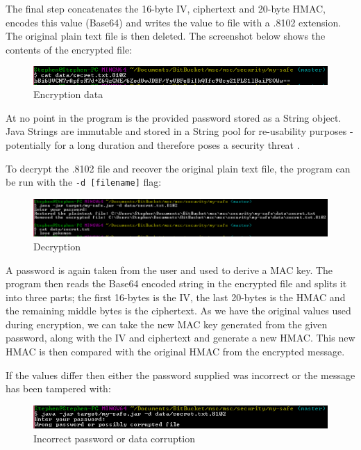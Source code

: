\documentclass[journal,comsoc]{IEEEtran}
\begin{document}
	The final step concatenates the 16-byte IV, ciphertext and 20-byte HMAC, encodes this value (Base64) and writes the value to file with a .8102 extension. The original plain text file is then deleted. The screenshot below shows the contents of the encrypted file:
	
	\begin{figure}[h!]
		\centering
		\includegraphics[width=0.9\linewidth]{images/safe_encrypted_data.png}
		\caption{Encryption data}
		\label{fig:encryptiondata}
	\end{figure}
	
	At no point in the program is the provided password stored as a String object. Java Strings are immutable and stored in a String pool for re-usability purposes - potentially for a long duration and therefore poses a security threat \cite{IEEEhowto:javastrings}.
	
	To decrypt the .8102 file and recover the original plain text file, the program can be run with the \texttt{-d [filename]} flag:
	
	\begin{figure}[h!]
		\centering
		\includegraphics[width=0.9\linewidth]{images/safe_decrypt.png}
		\caption{Decryption}
		\label{fig:decryption}
	\end{figure}
	
	A password is again taken from the user and used to derive a MAC key. The program then reads the Base64 encoded string in the encrypted file and splits it into three parts; the first 16-bytes is the IV, the last 20-bytes is the HMAC and the remaining middle bytes is the ciphertext. As we have the original values used during encryption, we can take the new MAC key generated from the given password, along with the IV and ciphertext and generate a new HMAC. This new HMAC is then compared with the original HMAC from the encrypted message. 
	
	If the values differ then either the password supplied was incorrect or the message has been tampered with: 
	
	\begin{figure}[h!]
		\centering
		\includegraphics[width=0.9\linewidth]{images/safe_corrupted.png}
		\caption{Incorrect password or data corruption}
		\label{fig:corrupted}
	\end{figure}
	
\end{document}

